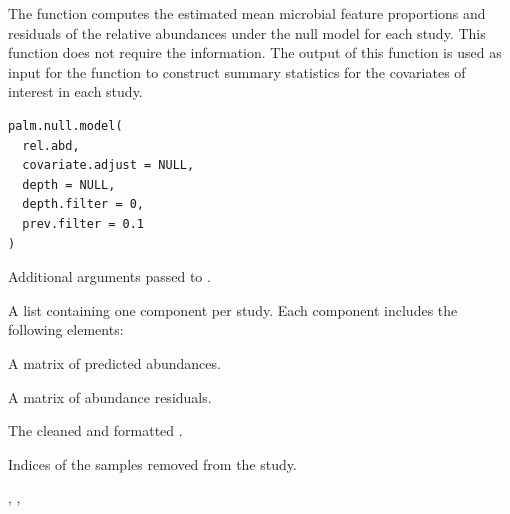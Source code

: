 \documentclass[a4paper]{book}
\begin{document}
%
\begin{Description}
The  function computes the estimated mean microbial feature
proportions and residuals of the relative abundances under the null model for each study.
This function does not require the  information.
The output of this function is used as input for the  function
to construct summary statistics for the covariates of interest in each study.
\end{Description}
%
\begin{Usage}
\begin{verbatim}
palm.null.model(
  rel.abd,
  covariate.adjust = NULL,
  depth = NULL,
  depth.filter = 0,
  prev.filter = 0.1
)
\end{verbatim}
\end{Usage}
%
\begin{Arguments}
\begin{ldescription}
\item[\code{...}] Additional arguments passed to .
\end{ldescription}
\end{Arguments}
%
\begin{Value}
A list containing one component per study. Each component includes the following elements:
\begin{ldescription}
\item[\code{Y\_I}] A matrix of predicted abundances.
\item[\code{Y\_R}] A matrix of abundance residuals.
\item[\code{Z}] The cleaned and formatted .
\item[\code{rm.sample.idx}] Indices of the samples removed from the study.
\end{ldescription}
\end{Value}
%
\begin{SeeAlso}
,
,
\end{SeeAlso}
%
\begin{Examples}
\end{Examples}
\printindex{}
\end{document}
